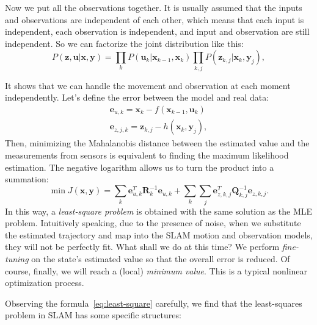 Now we put all the observations together. It is usually assumed that the inputs and observations are independent of each other, which means that each input is independent, each observation is independent, and input and observation are still independent. So we can factorize the joint distribution like this:
\begin{equation}
	P\left( {\mathbf{z},\mathbf{u}|\mathbf{x},\mathbf{y}} \right) = \prod\limits_k {P\left( {{\mathbf{u}_k }|{\mathbf{x}_{k-1}},{\mathbf{x}_k}} \right)} \prod\limits_{k,j} {P\left( {{\mathbf{z} _{k,j}}|{\mathbf{x}_k},{\mathbf{y}_j}} \right)},
\end{equation}

It shows that we can handle the movement and observation at each moment independently. Let's define the error between the model and real data: 
\begin{equation}
	\begin{array}{l}
		{\mathbf{e}_{u,k}} = {\mathbf{x}_k}-f\left( {{\mathbf{x}_{k-1}},{\mathbf{u}_k} } \right)\\
		{\mathbf{e}_{z,j,k}} = {\mathbf{z}_{k,j}}-h\left( {{\mathbf{x}_k},{\mathbf{y} _j}} \right),
	\end{array}
\end{equation}
Then, minimizing the Mahalanobis distance between the estimated value and the measurements from sensors is equivalent to finding the maximum likelihood estimation. The negative logarithm allows us to turn the product into a summation:
\begin{equation}
	\label{eq:least-square}
	\min J (\mathbf{x},\mathbf{y}) = \sum\limits_k {\mathbf{e}_{u,k}^T \mathbf{R}_k^{-1} {\mathbf{e}_{u,k}}} + \sum\limits_k {\sum\limits_j {\mathbf{e}_{z,k,j}^T \mathbf{Q}_ {k,j}^{-1}{\mathbf{e}_{z,k,j}}}}.
\end{equation}
In this way, a \textit{least-square problem} is obtained with the same solution as the MLE problem. Intuitively speaking, due to the presence of noise, when we substitute the estimated trajectory and map into the SLAM motion and observation models, they will not be perfectly fit. What shall we do at this time? We perform \textit{fine-tuning} on the state's estimated value so that the overall error is reduced. Of course, finally, we will reach a (local) \textit{minimum value}. This is a typical nonlinear optimization process.

Observing the formula~\eqref{eq:least-square} carefully, we find that the least-squares problem in SLAM has some specific structures:


